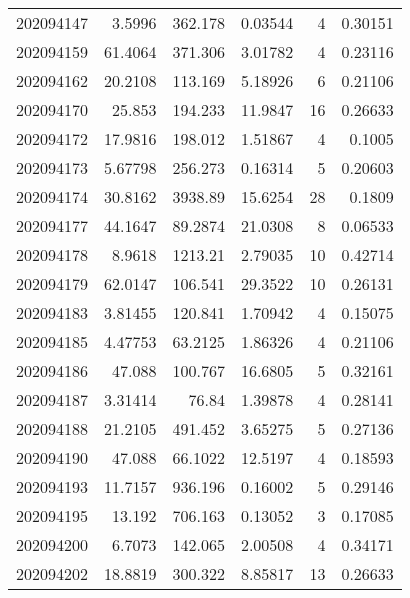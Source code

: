 \begin{tabular}{rrrrrr}
 202094147 &          3.5996  &      362.178  &            0.03544 &           4 & 0.30151 \\
 202094159 &         61.4064  &      371.306  &            3.01782 &           4 & 0.23116 \\
 202094162 &         20.2108  &      113.169  &            5.18926 &           6 & 0.21106 \\
 202094170 &         25.853   &      194.233  &           11.9847  &          16 & 0.26633 \\
 202094172 &         17.9816  &      198.012  &            1.51867 &           4 & 0.1005  \\
 202094173 &          5.67798 &      256.273  &            0.16314 &           5 & 0.20603 \\
 202094174 &         30.8162  &     3938.89   &           15.6254  &          28 & 0.1809  \\
 202094177 &         44.1647  &       89.2874 &           21.0308  &           8 & 0.06533 \\
 202094178 &          8.9618  &     1213.21   &            2.79035 &          10 & 0.42714 \\
 202094179 &         62.0147  &      106.541  &           29.3522  &          10 & 0.26131 \\
 202094183 &          3.81455 &      120.841  &            1.70942 &           4 & 0.15075 \\
 202094185 &          4.47753 &       63.2125 &            1.86326 &           4 & 0.21106 \\
 202094186 &         47.088   &      100.767  &           16.6805  &           5 & 0.32161 \\
 202094187 &          3.31414 &       76.84   &            1.39878 &           4 & 0.28141 \\
 202094188 &         21.2105  &      491.452  &            3.65275 &           5 & 0.27136 \\
 202094190 &         47.088   &       66.1022 &           12.5197  &           4 & 0.18593 \\
 202094193 &         11.7157  &      936.196  &            0.16002 &           5 & 0.29146 \\
 202094195 &         13.192   &      706.163  &            0.13052 &           3 & 0.17085 \\
 202094200 &          6.7073  &      142.065  &            2.00508 &           4 & 0.34171 \\
 202094202 &         18.8819  &      300.322  &            8.85817 &          13 & 0.26633 \\

\end{tabular}

